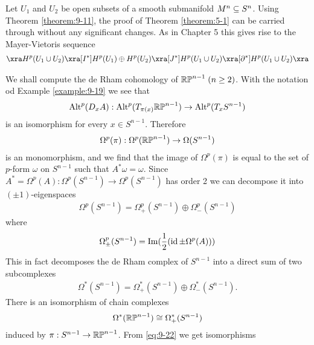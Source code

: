 \begin{remark}\label{remark:9-30}
  Let $U_1$ and $U_2$ be open subsets of a smooth submanifold $M^n\subseteq S^n$.
  Using Theorem \ref{theorem:9-11}, the proof of Theorem \ref{theorem:5-1} can be carried 
  through without any significant changes. As in Chapter 5 this gives rise to the Mayer-Vietoris 
  sequence
  \begin{align*}
    \xra H^p(U_1\cup U_2)
    \xra[I^*] H^p(U_1)\oplus H^p(U_2)
    \xra[J^*] H^p(U_1\cup U_2)
    \xra[\partial^*] H^p(U_1\cup U_2)
    \xra
  \end{align*}
\end{remark}


\begin{example}\label{example:9-31}
  We shall compute the de Rham cohomology of $\mathbb{RP}^{n-1}\; (n\ge 2)$. With the 
  notation od Example \ref{example:9-19} we see that 
  \begin{align*}
    \operatorname{Alt}^p(D_xA): \operatorname{Alt}^p(T_{\pi(x)}\mathbb{RP}^{n-1})
    \to \operatorname{Alt}^p(T_xS^{n-1})
  \end{align*}  
  is an isomorphism for every $x\in S^{n-1}$. Therefore 
  \begin{align*}
    \Omega^p(\pi):\Omega^p(\mathbb{RP}^{n-1})\to \Omega(S^{n-1})
  \end{align*}
  is an monomorphism, and we find that the image of $\Omega^p(\pi)$ is equal to the 
  set of $p$-form $\omega$ on $S^{n-1}$ such that $A^*\omega=\omega$. Since $A^* = \Omega^p(A):
  \Omega^p(S^{n-1})\to\Omega^p(S^{n-1})$ has order 2 we can decompose it into $(\pm 1)$-eigenspaces
  \begin{align*}
    \Omega^p(S^{n-1}) = \Omega_+^p(S^{n-1})\oplus\Omega_-^p(S^{n-1})
  \end{align*}
  where 
  \begin{align*}
    \Omega^p_\pm(S^{n-1}) = \operatorname{Im}(\frac12(\operatorname{id}\pm \Omega^p(A)))
  \end{align*}
  This in fact decomposes the de Rham complex of $S^{n-1}$ into a direct sum of two
  subcomplexes
  \begin{align}\label{eq:9-22}
    \Omega^*(S^{n-1}) = \Omega_+^*(S^{n-1})\oplus\Omega_-^*(S^{n-1}).
  \end{align}
  There is an isomorphism of chain complexes
  \begin{align}\label{eq:9-23}
    \Omega^*(\mathbb{RP}^{n-1})\cong \Omega^*_+(S^{n-1})
  \end{align}
  induced by $\pi:S^{n-1}\to\mathbb{RP}^{n-1}$. From \eqref{eq:9-22} we get isomorphisms 
  \begin{align*}

\end{align*}
\end{example}
